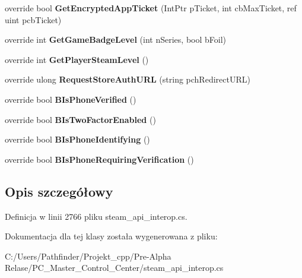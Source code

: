 \begin{DoxyCompactItemize}
\item 
\mbox{\label{class_valve_1_1_steamworks_1_1_c_steam_user_aa0b3b591add13dab591f02a98ca526d4}} 
override bool {\bfseries Get\+Encrypted\+App\+Ticket} (Int\+Ptr p\+Ticket, int cb\+Max\+Ticket, ref uint pcb\+Ticket)
\item 
\mbox{\label{class_valve_1_1_steamworks_1_1_c_steam_user_af52d1bf61b5a87ac40dd7bbd1c5bcc58}} 
override int {\bfseries Get\+Game\+Badge\+Level} (int n\+Series, bool b\+Foil)
\item 
\mbox{\label{class_valve_1_1_steamworks_1_1_c_steam_user_a54b14e144c97f9da511b82c3c3517f90}} 
override int {\bfseries Get\+Player\+Steam\+Level} ()
\item 
\mbox{\label{class_valve_1_1_steamworks_1_1_c_steam_user_a9a728ef0d5e5da864218f7e6d47d6bad}} 
override ulong {\bfseries Request\+Store\+Auth\+U\+RL} (string pch\+Redirect\+U\+RL)
\item 
\mbox{\label{class_valve_1_1_steamworks_1_1_c_steam_user_a1cd8cd579ff44ce8b5fd06cece8f0fee}} 
override bool {\bfseries B\+Is\+Phone\+Verified} ()
\item 
\mbox{\label{class_valve_1_1_steamworks_1_1_c_steam_user_aa2e9ec4ef2ce98b34362fba85f26cc73}} 
override bool {\bfseries B\+Is\+Two\+Factor\+Enabled} ()
\item 
\mbox{\label{class_valve_1_1_steamworks_1_1_c_steam_user_aaac4fe71e5d6a0773fbbb58326ac73ef}} 
override bool {\bfseries B\+Is\+Phone\+Identifying} ()
\item 
\mbox{\label{class_valve_1_1_steamworks_1_1_c_steam_user_af7135c38474c4121b1b5e8a133441cd7}} 
override bool {\bfseries B\+Is\+Phone\+Requiring\+Verification} ()
\end{DoxyCompactItemize}


\subsection{Opis szczegółowy}


Definicja w linii 2766 pliku steam\+\_\+api\+\_\+interop.\+cs.



Dokumentacja dla tej klasy została wygenerowana z pliku\+:\begin{DoxyCompactItemize}
\item 
C\+:/\+Users/\+Pathfinder/\+Projekt\+\_\+cpp/\+Pre-\/\+Alpha Relase/\+P\+C\+\_\+\+Master\+\_\+\+Control\+\_\+\+Center/steam\+\_\+api\+\_\+interop.\+cs\end{DoxyCompactItemize}

